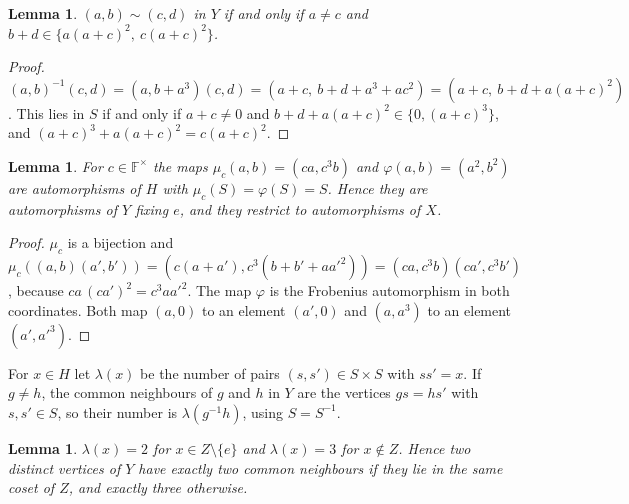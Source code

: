 \documentclass[preprint,12pt]{elsarticle}
\newtheorem{lemma}[theorem]{Lemma}
\theoremstyle{definition}
\newcommand{\F}{\mathbb{F}}
\begin{document}
\begin{lemma}\label{lem:adj}
$(a,b)\sim(c,d)$ in $Y$ if and only if $a\ne c$ and $b+d\in\{a(a+c)^2,\ c(a+c)^2\}$.
\end{lemma}

\begin{proof}
$(a,b)^{-1}(c,d)=(a,b+a^3)(c,d)=(a+c,\ b+d+a^3+ac^2)=(a+c,\ b+d+a(a+c)^2)$. This lies in $S$ if and only if $a+c\ne0$ and $b+d+a(a+c)^2\in\{0,(a+c)^3\}$, and $(a+c)^3+a(a+c)^2=c(a+c)^2$.
\end{proof}

\begin{lemma}\label{lem:aut}
For $c\in\F^\times$ the maps $\mu_c(a,b)=(ca,c^3b)$ and $\varphi(a,b)=(a^2,b^2)$ are automorphisms of $H$ with $\mu_c(S)=\varphi(S)=S$. Hence they are automorphisms of $Y$ fixing $e$, and they restrict to automorphisms of $X$.
\end{lemma}

\begin{proof}
$\mu_c$ is a bijection and $\mu_c((a,b)(a',b'))=(c(a+a'),c^3(b+b'+aa'^2))=(ca,c^3b)(ca',c^3b')$, because $ca\,(ca')^2=c^3aa'^2$. The map $\varphi$ is the Frobenius automorphism in both coordinates. Both map $(a,0)$ to an element $(a',0)$ and $(a,a^3)$ to an element $(a',a'^3)$.
\end{proof}

For $x\in H$ let $\lambda(x)$ be the number of pairs $(s,s')\in S\times S$ with $ss'=x$. If $g\ne h$, the common neighbours of $g$ and $h$ in $Y$ are the vertices $gs=hs'$ with $s,s'\in S$, so their number is $\lambda(g^{-1}h)$, using $S=S^{-1}$.

\begin{lemma}\label{lem:lambda}
$\lambda(x)=2$ for $x\in Z\setminus\{e\}$ and $\lambda(x)=3$ for $x\notin Z$. Hence two distinct vertices of $Y$ have exactly two common neighbours if they lie in the same coset of $Z$, and exactly three otherwise.
\end{lemma}
\end{document}
